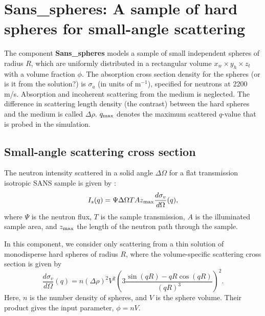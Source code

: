 \section{Sans\_spheres: A sample of hard spheres for small-angle scattering}
\label{sans}


The component {\bf Sans\_spheres} models a sample of small independent
spheres of radius $R$, which are uniformly distributed
in a rectangular volume $x_w \times y_h \times z_t$ with a volume
fraction $\phi$. The absorption cross section density for the spheres
(or is it from the solution?)
is $\sigma_a$ (in units of m$^{-1}$), specified
for neutrons at 2200 m/s. Absorption and incoherent scattering from the medium
is neglected.
The difference in scattering length density
(the contrast) between the hard spheres and the medium is called $\Delta \rho$.
$q_{\rm max}$ denotes the maximum scattered $q$-value that is probed
in the simulation.

\subsection{Small-angle scattering cross section}
The neutron intensity scattered in a solid angle $\Delta \Omega$
for a flat transmission isotropic SANS sample is given by \cite{ILLblue}:
\begin{equation}
I_s(q) = \Psi \Delta\Omega T A z_{\rm max} \frac{d\sigma_v}{d\Omega}(q) ,
\end{equation}
where $\Psi$ is the neutron flux, $T$ is the sample transmission,
$A$ is the illuminated sample area, and $z_{\rm max}$ the length of
the neutron path through the sample.

In this component, we consider only scattering from a thin solution
of monodisperse hard spheres of radius $R$, where the volume-specific
scattering cross section is given by \cite{ILLblue}
\begin{equation}
\frac{d\sigma_v}{d\Omega}(q) =
  n (\Delta\rho)^2 V^2 \left( 3\frac{\sin(qR)-qR\cos(qR)}{(qR)^3} \right)^2 .
\end{equation}
Here, $n$ is the number density of spheres, and $V$ is the
sphere volume. Their product gives the input parameter, $\phi=nV$.

